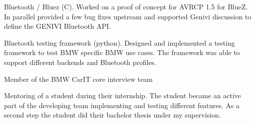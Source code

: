\documentclass[alan.tex]{subfiles}
\begin{document}
\begin{my_desc}
        \begin{my_bullets}
          \item Bluetooth / Bluez (C).  Worked on a proof of concept for AVRCP 1.5 for BlueZ.
            In parallel provided a few bug fixes upstream and supported Genivi discussion to define the
            GENIVI Bluetooth API.
          \item Bluetooth testing framework (python). Designed and implemented a testing framework to
            test BMW specific BMW use cases. The framework was able to support different backends and
            Bluetooth profiles.
        \end{my_bullets}
      \item[Member] of the BMW CarIT core interview team
      \item[Mentoring] of a student during their internship. The student became an active part of the developing
        team implementing and testing different features. As a second step the student did their bachelor thesis
        under my supervision.
    \end{my_desc}
\end{document}
